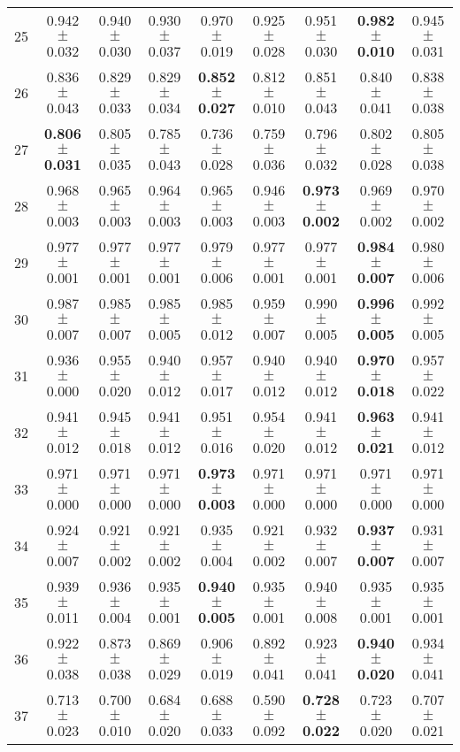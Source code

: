 \begin{table}[!ht]
{\begin{tabular}{r c c c c c c c c}
25 & 0.942 $\pm$ 0.032 & 0.940 $\pm$ 0.030 & 0.930 $\pm$ 0.037 & 0.970 $\pm$ 0.019 & 0.925 $\pm$ 0.028 & 0.951 $\pm$ 0.030 & \textbf{0.982 $\pm$ 0.010} & 0.945 $\pm$ 0.031 \\
26 & 0.836 $\pm$ 0.043 & 0.829 $\pm$ 0.033 & 0.829 $\pm$ 0.034 & \textbf{0.852 $\pm$ 0.027} & 0.812 $\pm$ 0.010 & 0.851 $\pm$ 0.043 & 0.840 $\pm$ 0.041 & 0.838 $\pm$ 0.038 \\
27 & \textbf{0.806 $\pm$ 0.031} & 0.805 $\pm$ 0.035 & 0.785 $\pm$ 0.043 & 0.736 $\pm$ 0.028 & 0.759 $\pm$ 0.036 & 0.796 $\pm$ 0.032 & 0.802 $\pm$ 0.028 & 0.805 $\pm$ 0.038 \\
28 & 0.968 $\pm$ 0.003 & 0.965 $\pm$ 0.003 & 0.964 $\pm$ 0.003 & 0.965 $\pm$ 0.003 & 0.946 $\pm$ 0.003 & \textbf{0.973 $\pm$ 0.002} & 0.969 $\pm$ 0.002 & 0.970 $\pm$ 0.002 \\
29 & 0.977 $\pm$ 0.001 & 0.977 $\pm$ 0.001 & 0.977 $\pm$ 0.001 & 0.979 $\pm$ 0.006 & 0.977 $\pm$ 0.001 & 0.977 $\pm$ 0.001 & \textbf{0.984 $\pm$ 0.007} & 0.980 $\pm$ 0.006 \\
30 & 0.987 $\pm$ 0.007 & 0.985 $\pm$ 0.007 & 0.985 $\pm$ 0.005 & 0.985 $\pm$ 0.012 & 0.959 $\pm$ 0.007 & 0.990 $\pm$ 0.005 & \textbf{0.996 $\pm$ 0.005} & 0.992 $\pm$ 0.005 \\
31 & 0.936 $\pm$ 0.000 & 0.955 $\pm$ 0.020 & 0.940 $\pm$ 0.012 & 0.957 $\pm$ 0.017 & 0.940 $\pm$ 0.012 & 0.940 $\pm$ 0.012 & \textbf{0.970 $\pm$ 0.018} & 0.957 $\pm$ 0.022 \\
32 & 0.941 $\pm$ 0.012 & 0.945 $\pm$ 0.018 & 0.941 $\pm$ 0.012 & 0.951 $\pm$ 0.016 & 0.954 $\pm$ 0.020 & 0.941 $\pm$ 0.012 & \textbf{0.963 $\pm$ 0.021} & 0.941 $\pm$ 0.012 \\
33 & 0.971 $\pm$ 0.000 & 0.971 $\pm$ 0.000 & 0.971 $\pm$ 0.000 & \textbf{0.973 $\pm$ 0.003} & 0.971 $\pm$ 0.000 & 0.971 $\pm$ 0.000 & 0.971 $\pm$ 0.000 & 0.971 $\pm$ 0.000 \\
34 & 0.924 $\pm$ 0.007 & 0.921 $\pm$ 0.002 & 0.921 $\pm$ 0.002 & 0.935 $\pm$ 0.004 & 0.921 $\pm$ 0.002 & 0.932 $\pm$ 0.007 & \textbf{0.937 $\pm$ 0.007} & 0.931 $\pm$ 0.007 \\
35 & 0.939 $\pm$ 0.011 & 0.936 $\pm$ 0.004 & 0.935 $\pm$ 0.001 & \textbf{0.940 $\pm$ 0.005} & 0.935 $\pm$ 0.001 & 0.940 $\pm$ 0.008 & 0.935 $\pm$ 0.001 & 0.935 $\pm$ 0.001 \\
36 & 0.922 $\pm$ 0.038 & 0.873 $\pm$ 0.038 & 0.869 $\pm$ 0.029 & 0.906 $\pm$ 0.019 & 0.892 $\pm$ 0.041 & 0.923 $\pm$ 0.041 & \textbf{0.940 $\pm$ 0.020} & 0.934 $\pm$ 0.041 \\
37 & 0.713 $\pm$ 0.023 & 0.700 $\pm$ 0.010 & 0.684 $\pm$ 0.020 & 0.688 $\pm$ 0.033 & 0.590 $\pm$ 0.092 & \textbf{0.728 $\pm$ 0.022} & 0.723 $\pm$ 0.020 & 0.707 $\pm$ 0.021 \\

\end{tabular}}
\end{table}
